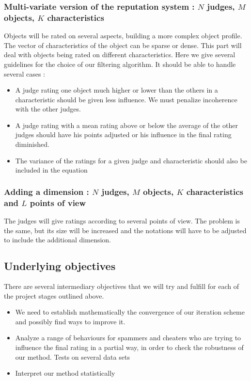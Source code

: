 \documentclass[12pt,a4paper,notitlepage]{article}
\begin{document}
\subsubsection*{Multi-variate version of the reputation system : $N$ judges, $M$ objects, $K$ characteristics}
Objects will be rated on several aspects, building a more complex object profile. The vector of characteristics of the object can be sparse or dense.
This part will deal with objects being rated on different characteristics. 
Here we give several guidelines for the choice of our filtering algorithm. It should be able to handle several cases :
\begin{itemize}
\item A judge rating one object much higher or lower than the others in a characteristic should be given less influence. We must penalize incoherence with the other judges.
\item A judge rating with a mean rating above or below the average of the other judges should have his points adjusted or his influence in the final rating diminished.
\item The variance of the ratings for a given judge and characteristic should also be included in the equation
\end{itemize}

\subsubsection*{Adding a dimension : $N$ judges, $M$ objects, $K$ characteristics and $L$ points of view}
The judges will give ratings according to several points of view. The problem is the same, but its size will be increased and the notations will have to be adjusted to include the additional dimension.
\subsection*{Underlying objectives}
There are several intermediary objectives that we will try and fulfill for each of the project stages outlined above.
\begin{itemize}
\item We need to establish mathematically the convergence of our iteration scheme and possibly find ways to improve it.
\item Analyze a range of behaviours for spammers and cheaters who are trying to influence the final rating in a partial way, in order to check the robustness of our method. Tests on several data sets
\item Interpret our method statistically
\end{itemize}
\end{document}
